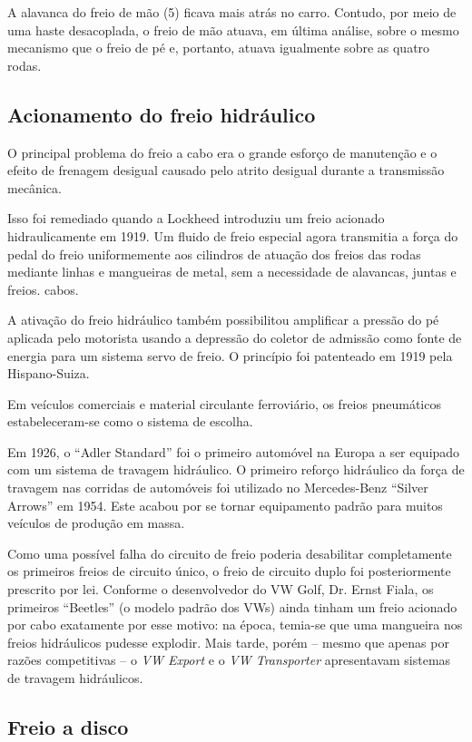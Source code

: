 A alavanca do freio de mão (5) ficava mais atrás no carro. Contudo, por meio de uma haste desacoplada, o freio de mão atuava, em última análise, sobre o mesmo mecanismo que o freio de pé e, portanto, atuava igualmente sobre as quatro rodas.
    
\subsection{Acionamento do freio hidráulico }

O principal problema do freio a cabo era o grande esforço de manutenção e o efeito de frenagem desigual causado pelo atrito desigual durante a transmissão mecânica. 

Isso foi remediado quando a Lockheed introduziu um freio acionado hidraulicamente em 1919. Um fluido de freio especial agora transmitia a força do pedal do freio uniformemente aos cilindros de atuação dos freios das rodas mediante linhas e mangueiras de metal, sem a necessidade de alavancas, juntas e freios. cabos. 

A ativação do freio hidráulico também possibilitou amplificar a pressão do pé aplicada pelo motorista usando a depressão do coletor de admissão como fonte de energia para um sistema servo de freio. O princípio foi patenteado em 1919 pela Hispano-Suiza. 

Em veículos comerciais e material circulante ferroviário, os freios pneumáticos estabeleceram-se como o sistema de escolha.

Em 1926, o “Adler Standard” foi o primeiro automóvel na Europa a ser equipado com um sistema de travagem hidráulico. O primeiro reforço hidráulico da força de travagem nas corridas de automóveis foi utilizado no Mercedes-Benz “Silver Arrows” em 1954. Este acabou por se tornar equipamento padrão para muitos veículos de produção em massa. 

Como uma possível falha do circuito de freio poderia desabilitar completamente os primeiros freios de circuito único, o freio de circuito duplo foi posteriormente prescrito por lei. Conforme o desenvolvedor do VW Golf, Dr. Ernst Fiala, os primeiros “Beetles” (o modelo padrão dos VWs) ainda tinham um freio acionado por cabo exatamente por esse motivo: na época, temia-se que uma mangueira nos freios hidráulicos pudesse explodir. Mais tarde, porém – mesmo que apenas por razões competitivas – o \textit{VW Export} e o \textit{VW Transporter} apresentavam sistemas de travagem hidráulicos.

\subsection{Freio a disco }

